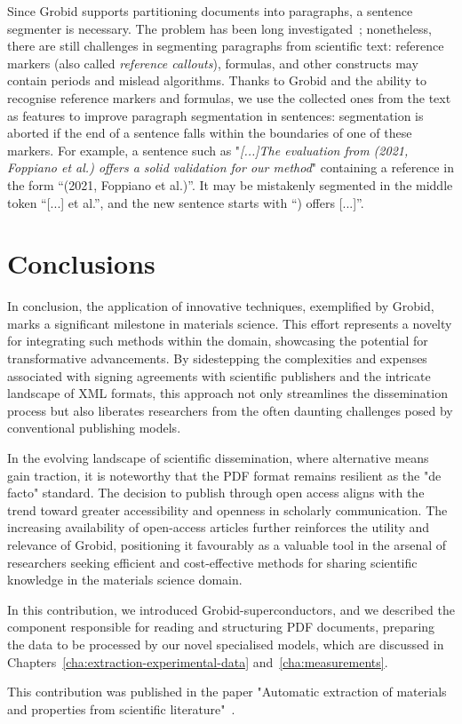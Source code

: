 Since Grobid supports partitioning documents into paragraphs, a sentence segmenter is necessary. The problem has been long investigated~\cite{sadvilkar2020pysbd,loper2002nltk,neumann2019scispacy,gillick2009sentence,read2012sentence,spacy2,bling2020}; nonetheless, there are still challenges in segmenting paragraphs from scientific text: reference markers (also called \textit{reference callouts}), formulas, and other constructs may contain periods and mislead algorithms. 
Thanks to Grobid and the ability to recognise reference markers and formulas, we use the collected ones from the text as features to improve paragraph segmentation in sentences: segmentation is aborted if the end of a sentence falls within the boundaries of one of these markers.
For example, a sentence such as "\textit{[...]The evaluation from (2021, Foppiano et al.) offers a solid validation for our method}" containing a reference in the form ``(2021, Foppiano et al.)''. It may be mistakenly segmented in the middle token ``[...] et al.'', and the new sentence starts with ``) offers [...]''. 

\section{Conclusions}

In conclusion, the application of innovative techniques, exemplified by Grobid, marks a significant milestone in materials science. This effort represents a novelty for integrating such methods within the domain, showcasing the potential for transformative advancements. 
By sidestepping the complexities and expenses associated with signing agreements with scientific publishers and the intricate landscape of XML formats, this approach not only streamlines the dissemination process but also liberates researchers from the often daunting challenges posed by conventional publishing models.

In the evolving landscape of scientific dissemination, where alternative means gain traction, it is noteworthy that the PDF format remains resilient as the "de facto" standard. The decision to publish through open access aligns with the trend toward greater accessibility and openness in scholarly communication. 
The increasing availability of open-access articles further reinforces the utility and relevance of Grobid, positioning it favourably as a valuable tool in the arsenal of researchers seeking efficient and cost-effective methods for sharing scientific knowledge in the materials science domain.

In this contribution, we introduced Grobid-superconductors, and we described the component responsible for reading and structuring PDF documents, preparing the data to be processed by our novel specialised models, which are discussed in Chapters~\ref{cha:extraction-experimental-data} and~\ref{cha:measurements}.

This contribution was published in the paper "Automatic extraction of materials and properties from scientific literature"~\cite{foppiano2023automatic}.